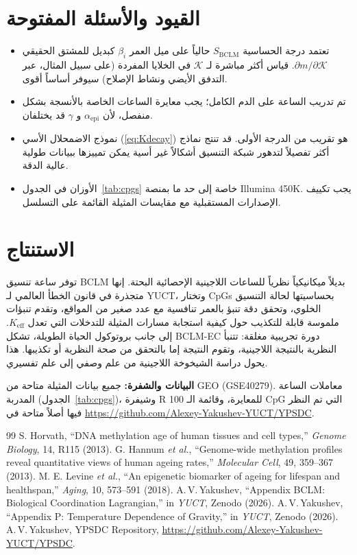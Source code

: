 \documentclass[11pt,a4paper]{article}
\newcommand{\REL}{\mathcal{K}}          %
\begin{document}
	\section{القيود والأسئلة المفتوحة}
	\label{sec:limitations}
	\begin{itemize}
		\item تعتمد درجة الحساسية \(S_{\mathrm{BCLM}}\) حالياً على ميل العمر \(\beta_i\) كبديل للمشتق الحقيقي \(\partial m/\partial \REL\). قياس أكثر مباشرة لـ \(\REL\) في الخلايا المفردة (على سبيل المثال، عبر التدفق الأيضي ونشاط الإصلاح) سيوفر أساساً أقوى.
		\item تم تدريب الساعة على الدم الكامل؛ يجب معايرة الساعات الخاصة بالأنسجة بشكل منفصل، لأن \(\alpha_{\mathrm{epi}}\) و \(\gamma\) قد يختلفان.
		\item نموذج الاضمحلال الأسي (\ref{eq:Kdecay}) هو تقريب من الدرجة الأولى. قد تنتج نماذج أكثر تفصيلاً لتدهور شبكة التنسيق أشكالاً غير أسية يمكن تمييزها ببيانات طولية عالية الدقة.
		\item الأوزان في الجدول~\ref{tab:cpgs} خاصة إلى حد ما بمنصة Illumina 450K. يجب تكييف الإصدارات المستقبلية مع مقايسات المثيلة القائمة على التسلسل.
	\end{itemize}
	
	\section{الاستنتاج}
	\label{sec:conclusion}
	توفر ساعة تنسيق BCLM بديلاً ميكانيكياً نظرياً للساعات اللاجينية الإحصائية البحتة. إنها متجذرة في قانون الخطأ العالمي لـ YUCT، وتختار CpGs بحساسيتها لحالة التنسيق الخلوي، وتحقق دقة تنبؤ بالعمر تنافسية مع عدد صغير من المواقع، وتقدم تنبؤات ملموسة قابلة للتكذيب حول كيفية استجابة مسارات المثيلة للتدخلات التي تعدل \(K_{\mathrm{eff}}\). إلى جانب بروتوكول الحياة الطويلة، تشكل BCLM-EC دورة تجريبية مغلقة: تتنبأ النظرية بالنتيجة اللاجينية، وتقوم النتيجة إما بالتحقق من صحة النظرية أو تكذيبها. هذا يحول دراسة الشيخوخة اللاجينية من علم وصفي إلى علم تفسيري.
	
	\vspace{0.5cm}
	\noindent\textbf{البيانات والشفرة:} جميع بيانات المثيلة متاحة من GEO (GSE40279). معاملات الساعة المدربة (الجدول~\ref{tab:cpgs})، وشيفرة R للمعايرة، وقائمة الـ 100 CpG التي تم النظر فيها أصلاً متاحة في \url{https://github.com/Alexey-Yakushev-YUCT/YPSDC}.
	
	\begin{thebibliography}{99}
		 S. Horvath, ``DNA methylation age of human tissues and cell types,'' \emph{Genome Biology}, 14, R115 (2013).
		 G. Hannum \emph{et al.}, ``Genome-wide methylation profiles reveal quantitative views of human ageing rates,'' \emph{Molecular Cell}, 49, 359--367 (2013).
		 M. E. Levine \emph{et al.}, ``An epigenetic biomarker of ageing for lifespan and healthspan,'' \emph{Aging}, 10, 573--591 (2018).
		 A.\,V.\,Yakushev, ``Appendix BCLM: Biological Coordination Lagrangian,'' in \emph{YUCT}, Zenodo (2026).
		 A.\,V.\,Yakushev, ``Appendix P: Temperature Dependence of Gravity,'' in \emph{YUCT}, Zenodo (2026).
		 A.\,V.\,Yakushev, YPSDC Repository, \url{https://github.com/Alexey-Yakushev-YUCT/YPSDC}.
	\end{thebibliography}
	
\end{document}

